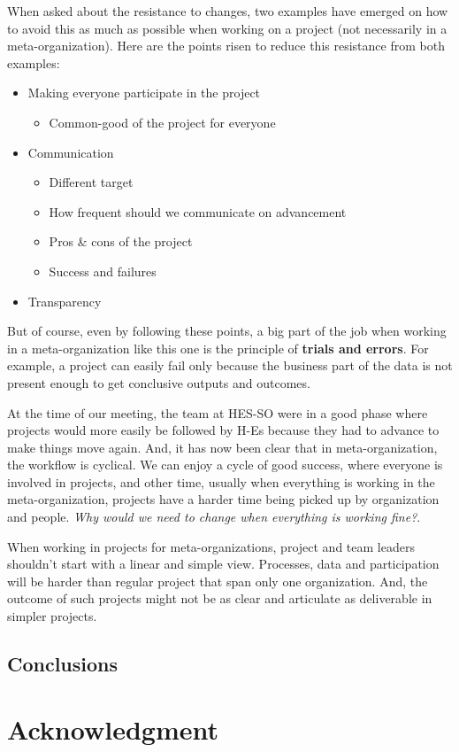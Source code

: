 \documentclass[conference]{IEEEtran}
\begin{document}
When asked about the resistance to changes, two examples have emerged on how to avoid this as much as possible when working on a project (not necessarily in a meta-organization). Here are the points risen to reduce this resistance from both examples:
\begin{itemize}
    \item Making everyone participate in the project
    \begin{itemize}
        \item Common-good of the project for everyone
    \end{itemize}
    \item Communication
    \begin{itemize}
        \item Different target
        \item How frequent should we communicate on advancement
        \item Pros \& cons of the project
        \item Success and failures
    \end{itemize}
    \item Transparency 
\end{itemize}
But of course, even by following these points, a big part of the job when working in a meta-organization like this one is the principle of \textbf{trials and errors}. For example, a project can easily fail only because the business part of the data is not present enough to get conclusive outputs and outcomes.

At the time of our meeting, the team at HES-SO were in a good phase where projects would more easily be followed by H-Es because they had to advance to make things move again. And, it has now been clear that in meta-organization, the workflow is cyclical. We can enjoy a cycle of good success, where everyone is involved in projects, and other time, usually when everything is working in the meta-organization, projects have a harder time being picked up by organization and people. \textit{Why would we need to change when everything is working fine?}.

When working in projects for meta-organizations, project and team leaders shouldn't start with a linear and simple view. Processes, data and participation will be harder than regular project that span only one organization. And, the outcome of such projects might not be as clear and articulate as deliverable in simpler projects.




\subsection{Conclusions} 

\section*{Acknowledgment}
\vspace{12pt}


\end{document}

